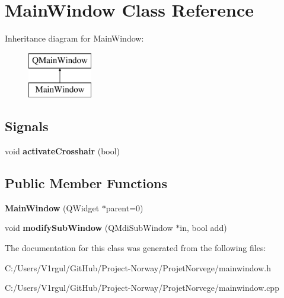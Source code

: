\hypertarget{class_main_window}{\section{Main\-Window Class Reference}
\label{class_main_window}
}
Inheritance diagram for Main\-Window\-:\begin{figure}[H]
\begin{center}
\leavevmode
\includegraphics[height=2.000000cm]{class_main_window}
\end{center}
\end{figure}
\subsection*{Signals}
\begin{DoxyCompactItemize}
\item 
\hypertarget{class_main_window_a8aca5460ce992afb3fcba398cc387466}{void {\bfseries activate\-Crosshair} (bool)}\label{class_main_window_a8aca5460ce992afb3fcba398cc387466}

\end{DoxyCompactItemize}
\subsection*{Public Member Functions}
\begin{DoxyCompactItemize}
\item 
\hypertarget{class_main_window_a8b244be8b7b7db1b08de2a2acb9409db}{{\bfseries Main\-Window} (Q\-Widget $\ast$parent=0)}\label{class_main_window_a8b244be8b7b7db1b08de2a2acb9409db}

\item 
\hypertarget{class_main_window_aa1aedeaf20f2f0b571a7bd655e3e819e}{void {\bfseries modify\-Sub\-Window} (Q\-Mdi\-Sub\-Window $\ast$in, bool add)}\label{class_main_window_aa1aedeaf20f2f0b571a7bd655e3e819e}

\end{DoxyCompactItemize}


The documentation for this class was generated from the following files\-:\begin{DoxyCompactItemize}
\item 
C\-:/\-Users/\-V1rgul/\-Git\-Hub/\-Project-\/\-Norway/\-Projet\-Norvege/mainwindow.\-h\item 
C\-:/\-Users/\-V1rgul/\-Git\-Hub/\-Project-\/\-Norway/\-Projet\-Norvege/mainwindow.\-cpp\end{DoxyCompactItemize}
